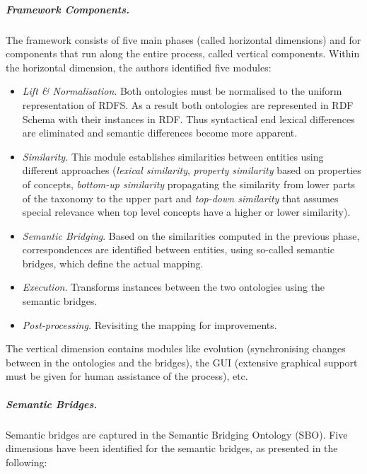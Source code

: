\subparagraph{Framework Components.}
The framework consists of five main phases (called horizontal
dimensions) and for components that run along the entire process,
called vertical components. Within the horizontal dimension, the
authors identified five modules: 

\begin{itemize}
\item \textit{Lift \& Normalisation}. Both ontologies must be normalised
to the uniform representation of RDFS. As a result both ontologies are
represented in RDF Schema with their instances in RDF. Thus syntactical
end lexical differences are eliminated and semantic differences become
more apparent. 
\item \textit{Similarity.} This module establishes similarities between
entities using different approaches (\textit{lexical similarity},
\textit{property similarity} based on properties of concepts,
\textit{bottom-up similarity} propagating the similarity from lower
parts of the taxonomy to the upper part and \textit{top-down
similarity} that assumes special relevance when top level concepts have
a higher or lower similarity). 
\item \textit{Semantic Bridging}. Based on the similarities computed in
the previous phase, correspondences are identified between entities,
using so-called semantic bridges, which define the actual mapping. 
\item \textit{Execution}. Transforms instances between the two
ontologies using the semantic bridges. 
\item \textit{Post-processing.} Revisiting the mapping for improvements.

\end{itemize}
The vertical dimension contains modules like evolution (synchronising
changes between in the ontologies and the bridges), the GUI (extensive
graphical support must be given for human assistance of the process),
etc. 

\subparagraph{Semantic Bridges.}
Semantic bridges are captured in the Semantic Bridging Ontology (SBO).
Five dimensions have been identified for the semantic bridges, as
presented in the following: 

